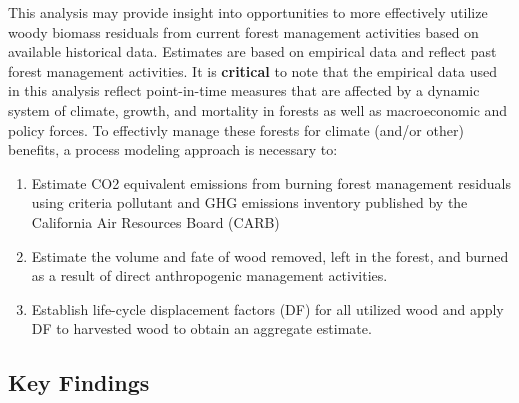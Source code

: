 \documentclass[a4paper]{article}
\begin{document}
This analysis may provide insight into
opportunities to more effectively utilize woody biomass residuals from
current forest management activities based on available historical
data. Estimates are based on empirical data and reflect past forest
management activities. It is \textbf{critical} to note that the empirical
data used in this analysis reflect point-in-time measures that are
affected by a dynamic system of climate, growth, and mortality in
forests as well as macroeconomic and policy forces. To effectivly
manage these forests for climate (and/or other) benefits, a process modeling
approach is necessary to: 

\begin{enumerate}
\item Estimate CO2 equivalent emissions from burning forest management
residuals using criteria pollutant and GHG emissions inventory
published by the California Air Resources Board (CARB)

\item Estimate the volume and fate of wood removed, left in the
forest, and burned as a result of direct anthropogenic management
activities.

\item Establish life-cycle displacement factors (DF) for all
utilized wood and apply DF to harvested wood to obtain an aggregate estimate.
\end{enumerate}

\subsection{Key Findings}
\label{sec-1-1}
\end{document}
